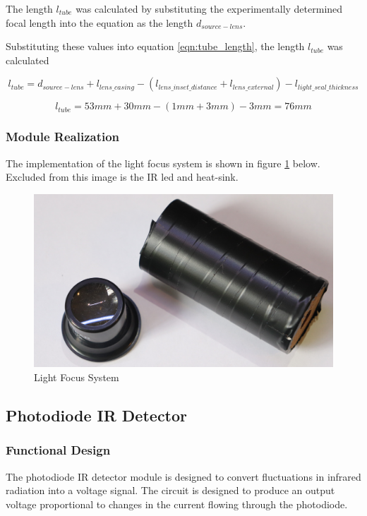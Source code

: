 The length $l_{tube}$ was calculated by substituting the experimentally determined focal length into the equation as the length $d_{source-lens}$.

Substituting these values into equation \ref{eqn:tube_length}, the length $l_{tube}$ was calculated

\[l_{tube} = d_{source-lens} + l_{lens\_casing} - (l_{lens\_inset\_distance} + l_{lens\_external}) - l_{light\_seal\_thickness}\]

\[l_{tube} = 53mm + 30mm - (1mm + 3mm) - 3mm = 76mm\]


\subsubsection{Module Realization}
The implementation of the light focus system is shown in figure \ref{fig:module_light_focus} below. Excluded from this image is the IR led and heat-sink.

\begin{figure}[H]
	\centering
	\includegraphics[width=.6\textwidth]{figures/modules/light_focus_tube_lens.jpg}
	\caption{Light Focus System}
	\label{fig:module_light_focus}
\end{figure}







\subsection{Photodiode IR Detector}

\subsubsection{Functional Design}
The photodiode IR detector module is designed to convert fluctuations in infrared radiation into a voltage signal. The circuit is designed to produce an output voltage proportional to changes in the current flowing through the photodiode.



